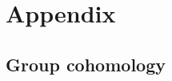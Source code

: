 \documentclass[14pt]{extarticle}
\newcommand{\C}{\mathbb{C}}
\newcommand{\bC}{\mathsf{C}}
\newcommand{\bP}{\mathbb{P}}
\newcommand{\cB}{\mathscr{B}}
\newcommand{\fC}{\mathfrak{C}}
\newcommand{\fn}{\mathfrak{n}}
\newcommand{\fb}{\mathfrak{b}}
\DeclareMathOperator{\sgn}{sgn}
\theoremstyle{definition}
\begin{document}
 


  







\appendix 

\section{Appendix}

\subsection{Group cohomology}\label{a_coh}
\end{document}

